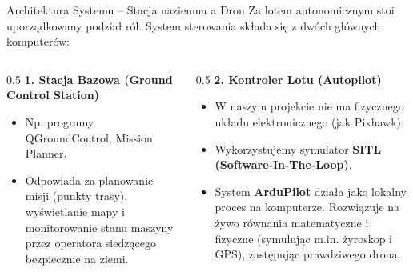 \begin{frame}{Architektura Systemu -- Stacja naziemna a Dron}
    Za lotem autonomicznym stoi uporządkowany podział ról. System sterowania składa się z dwóch głównych komputerów:
    
    \vspace{0.5cm}
    \begin{columns}
        \begin{column}{0.5\textwidth}
            \textbf{1. Stacja Bazowa (Ground Control Station)}
            \begin{itemize}
                \item Np. programy QGroundControl, Mission Planner.
                \item Odpowiada za planowanie misji (punkty trasy), wyświetlanie mapy i monitorowanie stanu maszyny przez operatora siedzącego bezpiecznie na ziemi.
            \end{itemize}
        \end{column}
        \begin{column}{0.5\textwidth}
            \textbf{2. Kontroler Lotu (Autopilot)}
            \begin{itemize}
                \item W naszym projekcie nie ma fizycznego układu elektronicznego (jak Pixhawk).
                \item Wykorzystujemy symulator \textbf{SITL (Software-In-The-Loop)}.
                \item System \textbf{ArduPilot} działa jako lokalny proces na komputerze. Rozwiązuje na żywo równania matematyczne i fizyczne (symulując m.in. żyroskop i GPS), zastępując prawdziwego drona.
            \end{itemize}
        \end{column}
    \end{columns}
\end{frame}

